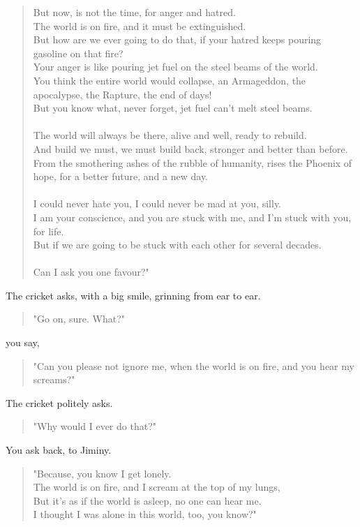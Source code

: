 \documentclass[16pt,openany,oneside]{book}
\begin{document}
\begin{quote}
    But now, is not the time, for anger and hatred. \\
    The world is on fire, and it must be extinguished. \\
    But how are we ever going to do that, if your hatred keeps pouring gasoline on that fire? \\
    Your anger is like pouring jet fuel on the steel beams of the world. \\
    You think the entire world would collapse, an Armageddon, the apocalypse, the Rapture, the end of days! \\
    But you know what, never forget, jet fuel can't melt steel beams.
    \\\\
    The world will always be there, alive and well, ready to rebuild. \\
    And build we must, we must build back, stronger and better than before. \\
    From the smothering ashes of the rubble of humanity, rises the Phoenix of hope, for a better future, and a new day.
    \\\\
    I could never hate you, I could never be mad at you, silly. \\
    I am your conscience, and you are stuck with me, and I'm stuck with you, for life. \\
    But if we are going to be stuck with each other for several decades.
    \\\\
     Can I ask you one favour?"
\end{quote}

The cricket asks, with a big smile, grinning from ear to ear.

\begin{quote}
    "Go on, sure. What?"
\end{quote}

you say,

\begin{quote}
   "Can you please not ignore me, when the world is on fire, and you hear my screams?"
\end{quote}

The cricket politely asks.

\begin{quote}
    "Why would I ever do that?"
\end{quote}

You ask back, to Jiminy.

\begin{quote}
    "Because, you know I get lonely. \\
     The world is on fire, and I scream at the top of my lungs, \\
     But it's as if the world is asleep, no one can hear me. \\
     I thought I was alone in this world, too, you know?"
\end{quote}
\end{document}
